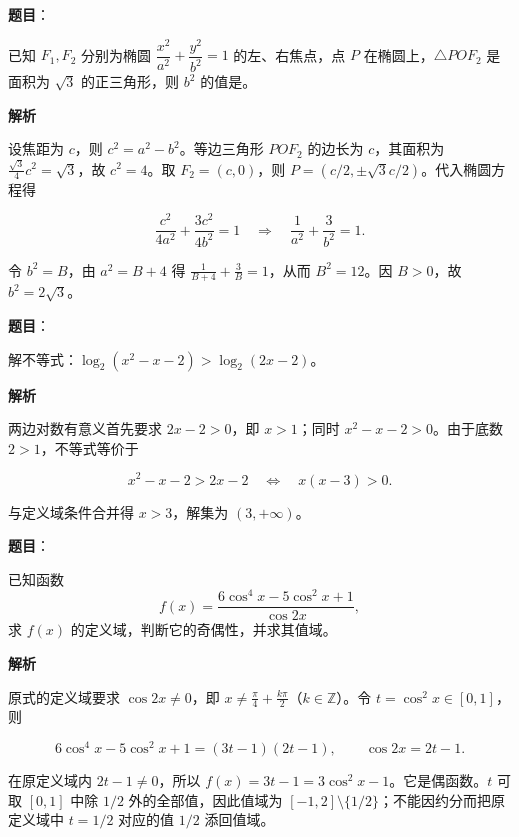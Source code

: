 \begin{answer}

\textbf{题目}：

已知 $F_1,F_2$ 分别为椭圆 $\dfrac{x^2}{a^2}+\dfrac{y^2}{b^2}=1$ 的左、右焦点，点 $P$ 在椭圆上，$\triangle POF_2$ 是面积为 $\sqrt3$ 的正三角形，则 $b^2$ 的值是\underline{\qquad}。

\textbf{解析}

设焦距为 $c$，则 $c^2=a^2-b^2$。等边三角形 $POF_2$ 的边长为 $c$，其面积为 $\frac{\sqrt3}{4}c^2=\sqrt3$，故 $c^2=4$。取 $F_2=(c,0)$，则 $P=(c/2,\pm\sqrt3c/2)$。代入椭圆方程得

\nopagebreak[4]
\[
\frac{c^2}{4a^2}+\frac{3c^2}{4b^2}=1
\quad\Longrightarrow\quad
\frac1{a^2}+\frac3{b^2}=1.
\]

令 $b^2=B$，由 $a^2=B+4$ 得 $\frac1{B+4}+\frac3B=1$，从而 $B^2=12$。因 $B>0$，故 $b^2=2\sqrt3$。


\end{answer}
\begin{answer}

\textbf{题目}：

解不等式：$\log_2(x^2-x-2)>\log_2(2x-2)$。

\textbf{解析}

两边对数有意义首先要求 $2x-2>0$，即 $x>1$；同时 $x^2-x-2>0$。由于底数 $2>1$，不等式等价于

\nopagebreak[4]
\[
x^2-x-2>2x-2
\quad\Longleftrightarrow\quad
x(x-3)>0.
\]

与定义域条件合并得 $x>3$，解集为 $(3,+\infty)$。


\end{answer}
\begin{answer}

\textbf{题目}：

已知函数
\nopagebreak[4]
\[
f(x)=\frac{6\cos^4x-5\cos^2x+1}{\cos 2x},
\]
求 $f(x)$ 的定义域，判断它的奇偶性，并求其值域。

\textbf{解析}

原式的定义域要求 $\cos2x\ne0$，即 $x\ne\frac\pi4+\frac{k\pi}{2}$（$k\in\mathbb Z$）。令 $t=\cos^2x\in[0,1]$，则

\nopagebreak[4]
\[
6\cos^4x-5\cos^2x+1=(3t-1)(2t-1),
\qquad \cos2x=2t-1.
\]

在原定义域内 $2t-1\ne0$，所以 $f(x)=3t-1=3\cos^2x-1$。它是偶函数。$t$ 可取 $[0,1]$ 中除 $1/2$ 外的全部值，因此值域为 $[-1,2]\setminus\{1/2\}$；不能因约分而把原定义域中 $t=1/2$ 对应的值 $1/2$ 添回值域。


\end{answer}
